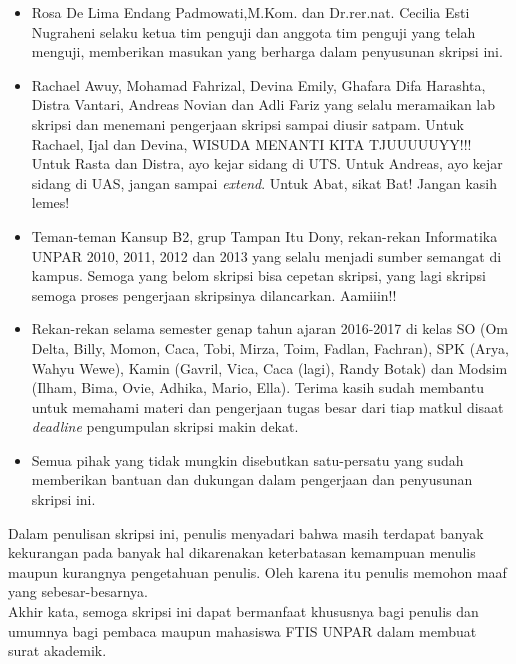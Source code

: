 {\begin{itemize}
	\item Rosa De Lima Endang Padmowati,M.Kom. dan Dr.rer.nat. Cecilia Esti Nugraheni selaku ketua tim penguji dan anggota tim penguji yang telah menguji, memberikan masukan yang berharga dalam penyusunan skripsi ini.
	\item Rachael Awuy, Mohamad Fahrizal, Devina Emily, Ghafara Difa Harashta, Distra Vantari, Andreas Novian dan Adli Fariz yang selalu meramaikan lab skripsi dan menemani pengerjaan skripsi sampai diusir satpam. Untuk Rachael, Ijal dan Devina, WISUDA MENANTI KITA TJUUUUUYY!!! Untuk Rasta dan Distra, ayo kejar sidang di UTS. Untuk Andreas, ayo kejar sidang di UAS, jangan sampai \textit{extend}. Untuk Abat, sikat Bat! Jangan kasih lemes!
	\item Teman-teman Kansup B2, grup Tampan Itu Dony, rekan-rekan Informatika UNPAR 2010, 2011, 2012 dan 2013 yang selalu menjadi sumber semangat di kampus. Semoga yang belom skripsi bisa cepetan skripsi, yang lagi skripsi semoga proses pengerjaan skripsinya dilancarkan. Aamiiin!!
	\item Rekan-rekan selama semester genap tahun ajaran 2016-2017 di kelas SO (Om Delta, Billy, Momon, Caca, Tobi, Mirza, Toim, Fadlan, Fachran), SPK (Arya, Wahyu Wewe), Kamin (Gavril, Vica, Caca (lagi), Randy Botak) dan Modsim (Ilham, Bima, Ovie, Adhika, Mario, Ella). Terima kasih sudah membantu untuk memahami materi dan pengerjaan tugas besar dari tiap matkul disaat \textit{deadline} pengumpulan skripsi makin dekat.
	\item Semua pihak yang tidak mungkin disebutkan satu-persatu yang sudah memberikan bantuan dan dukungan dalam pengerjaan dan penyusunan skripsi ini.
\end{itemize}
Dalam penulisan skripsi ini, penulis menyadari bahwa masih terdapat banyak kekurangan pada banyak hal dikarenakan keterbatasan kemampuan menulis maupun kurangnya pengetahuan penulis. Oleh karena itu penulis memohon maaf yang sebesar-besarnya.\\
Akhir kata, semoga skripsi ini dapat bermanfaat khususnya bagi penulis dan umumnya bagi pembaca maupun mahasiswa FTIS UNPAR dalam membuat surat akademik.} 


